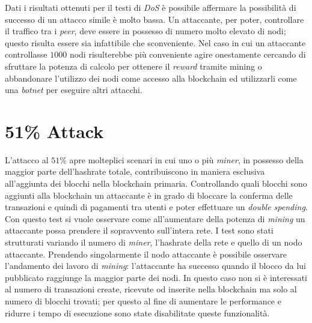 Dati i risultati ottenuti per il testi di \textit{DoS} è possibile affermare la possibilità di successo di un attacco simile è molto bassa. Un attaccante, per poter, controllare il traffico tra i \textit{peer}, deve essere in possesso di numero molto elevato di nodi; questo risulta essere sia infattibile che sconveniente. Nel caso in cui un attaccante controllasse $1000$ nodi risulterebbe più conveniente agire onestamente cercando di sfruttare la potenza di calcolo per ottenere il \textit{reward} tramite mining o abbandonare l'utilizzo dei nodi come accesso alla blockchain ed utilizzarli come una \textit{botnet} per eseguire altri attacchi.\newline

\clearpage
\section{51\% Attack}
L'attacco al $51\%$ apre molteplici scenari in cui uno o più \textit{miner}, in possesso della maggior parte dell'hashrate totale, contribuiscono in maniera esclusiva all'aggiunta dei blocchi nella blockchain primaria. Controllando quali blocchi sono aggiunti alla blockchain un attaccante è in grado di bloccare la conferma delle transazioni e quindi di pagamenti tra utenti e poter effettuare un \textit{double spending}.\newline
Con questo test si vuole osservare come all'aumentare della potenza di \textit{mining} un attaccante possa prendere il sopravvento sull'intera rete.\newline
I test sono stati strutturati variando il numero di \textit{miner}, l'hashrate della rete e quello di un nodo attaccante. Prendendo singolarmente il nodo attaccante è possibile osservare l'andamento dei lavoro di \textit{mining}: l'attaccante ha successo quando il blocco da lui pubblicato raggiunge la maggior parte dei nodi. In questo caso non si è interessati al numero di transazioni create, ricevute od inserite nella blockchain ma solo al numero di blocchi trovati; per questo al fine di aumentare le performance e ridurre i tempo di esecuzione sono state disabilitate queste funzionalità.
